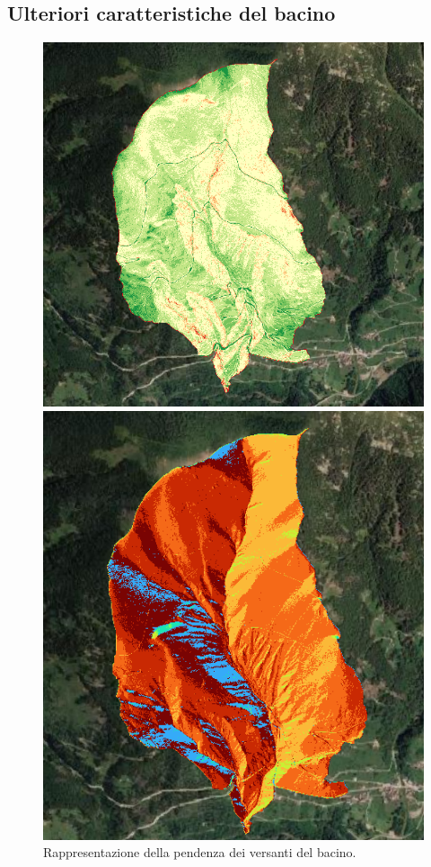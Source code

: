 \subsection{Ulteriori caratteristiche del bacino}
\begin{figure}[H] 
    \begin{minipage}[]{7cm}
        \includegraphics[scale=0.58]{immagini/bacino_slope.PNG}
        \caption{Rappresentazione della pendenza dei versanti del bacino.}
        \end{minipage}
        \hspace{2cm}
    \begin{minipage}[]{7cm}
        \includegraphics[scale=0.6]{immagini/bacino_orientamento_qgis.PNG}

\end{minipage}
\end{figure}
